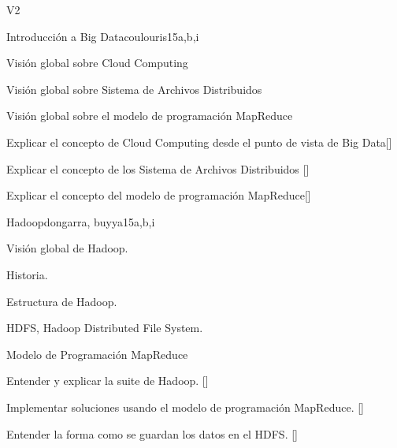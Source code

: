 \begin{syllabus}
\begin{competences}{V2}
    \item {}
    \item {} 
    \item {} 
    \item {} 
    \item {} 
\end{competences}

\begin{unit}{Introducción a Big Data}{}{coulouris}{15}{a,b,i}
\begin{topics}%
        \item Visión global sobre Cloud Computing
        \item Visión global sobre Sistema de Archivos Distribuidos%
        \item Visión global sobre el modelo de programación MapReduce%
\end{topics}
\begin{learningoutcomes}%
        \item Explicar el concepto de Cloud Computing desde el punto de vista de Big Data[\Familiarity] %
        \item Explicar el concepto de los Sistema de Archivos Distribuidos [\Familiarity] %
        \item Explicar el concepto del modelo de programación MapReduce[\Familiarity] %
\end{learningoutcomes}%
\end{unit}

\begin{unit}{Hadoop}{}{dongarra, buyya}{15}{a,b,i}
\begin{topics}
    \item Visión global de Hadoop.
    \item Historia.
    \item Estructura de Hadoop.
    \item HDFS, Hadoop Distributed File System.
    \item Modelo de Programación MapReduce
\end{topics}
\begin{learningoutcomes}
      \item Entender y explicar la suite de Hadoop. [\Familiarity]
      \item Implementar soluciones usando el modelo de programación MapReduce. [\Usage]
      \item Entender la forma como se guardan los datos en el HDFS. [\Familiarity] %
\end{learningoutcomes}
\end{unit}


\end{syllabus}
